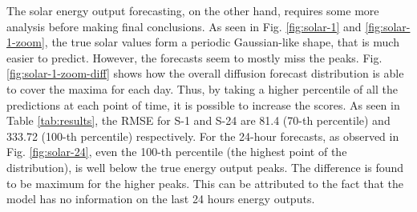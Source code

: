 \documentclass{article}
\begin{document}
The solar energy output forecasting, on the other hand, requires some more analysis before making final conclusions. As seen in Fig. \ref{fig:solar-1} and \ref{fig:solar-1-zoom}, the true solar values form a periodic Gaussian-like shape, that is much easier to predict. However, the forecasts seem to mostly miss the peaks. Fig. \ref{fig:solar-1-zoom-diff} shows how the overall diffusion forecast distribution is able to cover the maxima for each day. Thus, by taking a higher percentile of all the predictions at each point of time, it is possible to increase the scores. As seen in Table \ref{tab:results}, the RMSE for S-1 and S-24 are 81.4 (70-th percentile) and 333.72 (100-th percentile) respectively. For the 24-hour forecasts, as observed in Fig. \ref{fig:solar-24}, even the 100-th percentile (the highest point of the distribution), is well below the true energy output peaks. The difference is found to be maximum for the higher peaks. This can be attributed to the fact that the model has no information on the last 24 hours energy outputs.
\end{document}

